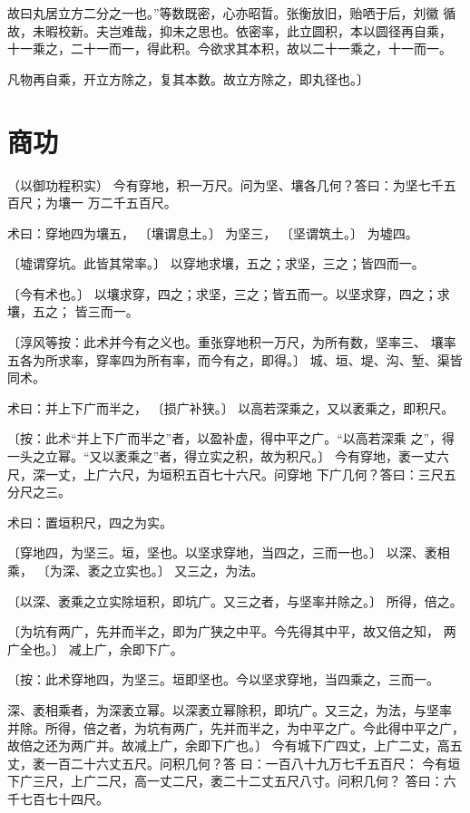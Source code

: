 \documentclass[a4paper,12pt,UTF8,twoside]{ctexbook}
\begin{document}
故曰丸居立方二分之一也。”等数既密，心亦昭晢。张衡放旧，贻哂于后，刘徽 循故，未暇校新。夫岂难哉，抑未之思也。依密率，此立圆积，本以圆径再自乘， 十一乘之，二十一而一，得此积。今欲求其本积，故以二十一乘之，十一而一。

凡物再自乘，开立方除之，复其本数。故立方除之，即丸径也。〕

\chapter{商功}
（以御功程积实） 今有穿地，积一万尺。问为坚、壤各几何？答曰：为坚七千五百尺；为壤一 万二千五百尺。

术曰：穿地四为壤五， 〔壤谓息土。〕 为坚三， 〔坚谓筑土。〕 为墟四。

〔墟谓穿坑。此皆其常率。〕 以穿地求壤，五之；求坚，三之；皆四而一。

〔今有术也。〕 以壤求穿，四之；求坚，三之；皆五而一。以坚求穿，四之；求壤，五之； 皆三而一。

〔淳风等按：此术并今有之义也。重张穿地积一万尺，为所有数，坚率三、 壤率五各为所求率，穿率四为所有率，而今有之，即得。〕 城、垣、堤、沟、堑、渠皆同术。

术曰：并上下广而半之， 〔损广补狭。〕 以高若深乘之，又以袤乘之，即积尺。

〔按：此术“并上下广而半之”者，以盈补虚，得中平之广。“以高若深乘 之”，得一头之立幂。“又以袤乘之”者，得立实之积，故为积尺。〕 今有穿地，袤一丈六尺，深一丈，上广六尺，为垣积五百七十六尺。问穿地 下广几何？答曰：三尺五分尺之三。

术曰：置垣积尺，四之为实。

〔穿地四，为坚三。垣，坚也。以坚求穿地，当四之，三而一也。〕 以深、袤相乘， 〔为深、袤之立实也。〕 又三之，为法。

〔以深、袤乘之立实除垣积，即坑广。又三之者，与坚率并除之。〕 所得，倍之。

〔为坑有两广，先并而半之，即为广狭之中平。今先得其中平，故又倍之知， 两广全也。〕 减上广，余即下广。

〔按：此术穿地四，为坚三。垣即坚也。今以坚求穿地，当四乘之，三而一。

深、袤相乘者，为深袤立幂。以深袤立幂除积，即坑广。又三之，为法，与坚率 并除。所得，倍之者，为坑有两广，先并而半之，为中平之广。今此得中平之广， 故倍之还为两广并。故减上广，余即下广也。〕 今有城下广四丈，上广二丈，高五丈，袤一百二十六丈五尺。问积几何？答 曰：一百八十九万七千五百尺： 今有垣下广三尺，上广二尺，高一丈二尺，袤二十二丈五尺八寸。问积几何？ 答曰：六千七百七十四尺。
\end{document}

